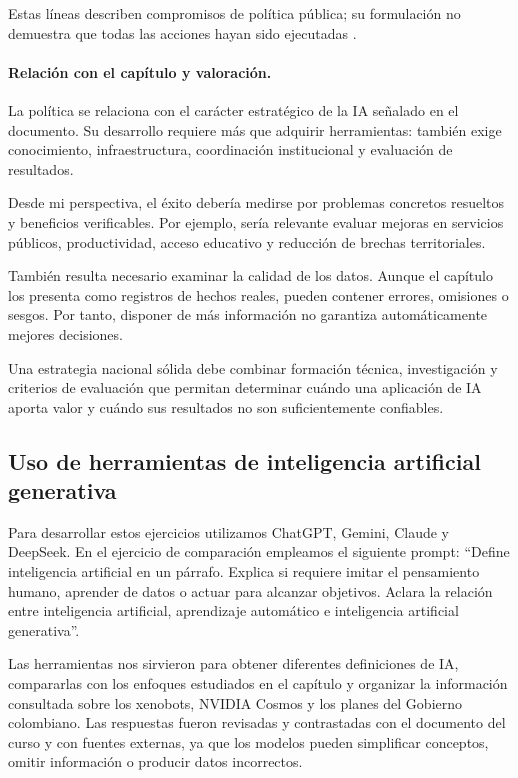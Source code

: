 \documentclass[14pt,twoside]{article}
\begin{document}
Estas líneas describen compromisos de política pública; su
formulación no demuestra que todas las acciones hayan sido
ejecutadas \cite{conpes4144}.

\paragraph{Relación con el capítulo y valoración.}

La política se relaciona con el carácter estratégico de la IA
señalado en el documento. Su desarrollo requiere más que adquirir
herramientas: también exige conocimiento, infraestructura,
coordinación institucional y evaluación de resultados.

Desde mi perspectiva, el éxito debería medirse por problemas
concretos resueltos y beneficios verificables. Por ejemplo, sería
relevante evaluar mejoras en servicios públicos, productividad,
acceso educativo y reducción de brechas territoriales.

También resulta necesario examinar la calidad de los datos.
Aunque el capítulo los presenta como registros de hechos reales,
pueden contener errores, omisiones o sesgos. Por tanto, disponer
de más información no garantiza automáticamente mejores decisiones.

Una estrategia nacional sólida debe combinar formación técnica,
investigación y criterios de evaluación que permitan determinar
cuándo una aplicación de IA aporta valor y cuándo sus resultados
no son suficientemente confiables.


\subsection{Uso de herramientas de inteligencia artificial generativa}

Para desarrollar estos ejercicios utilizamos ChatGPT, Gemini, Claude y DeepSeek. En el ejercicio de comparación empleamos el siguiente prompt: ``Define inteligencia artificial en un párrafo. Explica si requiere imitar el pensamiento humano, aprender de datos o actuar para alcanzar objetivos. Aclara la relación entre inteligencia artificial, aprendizaje automático e inteligencia artificial generativa''.

Las herramientas nos sirvieron para obtener diferentes definiciones de IA, compararlas con los enfoques estudiados en el capítulo y organizar la información consultada sobre los xenobots, NVIDIA Cosmos y los planes del Gobierno colombiano. Las respuestas fueron revisadas y contrastadas con el documento del curso y con fuentes externas, ya que los modelos pueden simplificar conceptos, omitir información o producir datos incorrectos.
\end{document}
